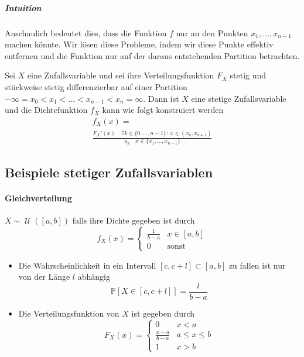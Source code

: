 \documentclass[a4paper,10pt]{article}
\def\P{\mathbb{P}}
\DeclareMathOperator{\Uniform}{\mathcal{U}}
\begin{document}
\subparagraph{Intuition} Anschaulich bedeutet dies, dass die Funktion \( f \) nur an den Punkten \( x_1, \dots, x_{n - 1} \)  machen könnte. Wir lösen diese Probleme, indem wir diese Punkte effektiv entfernen und die Funktion nur auf der daraus entstehenden Partition betrachten.

\begin{subbox}{}
    Sei \( X \) eine Zufallsvariable und sei ihre Verteilungsfunktion \( F_X \) stetig und stückweise stetig differenzierbar auf einer Partition \( -\infty = x_0 < x_1 < \dots < x_{n - 1} < x_n = \infty \). Dann ist \( X \) eine stetige Zufallsvariable und die Dichtefunktion \( f_X \) kann wie folgt konstruiert werden
    \begin{multline*}
        f_X(x) = \\
        \frac{F_X'(x) \quad \exists k \in \{0, \dots, n - 1\}: \: x \in (x_k, x_{k + 1})}{a_k \quad x \in \{x_1, \dots, x_{n - 1}\}}
    \end{multline*}
\end{subbox}


\subsection{Beispiele stetiger Zufallsvariablen}

\paragraph{Gleichverteilung} \( X \sim \Uniform([a, b]) \) falls ihre Dichte gegeben ist durch
\[ f_X(x) = \begin{cases}
    \frac{1}{b - a} & x \in [a, b] \\
    0 & \text{sonst}
\end{cases} \]

\begin{itemize}
    \item Die Wahrscheinlichkeit in ein Intervall \( [c, c + l] \subset [a, b] \) zu fallen ist nur von der Länge \( l \) abhängig \[ \P[X \in [c, c + l]] = \frac{l}{b - a} \]
    \item Die Verteilungsfunktion von \( X \) ist gegeben durch
    \[ F_X(x) = \begin{cases}
        0 & x < a \\
        \frac{x - a}{b - a} & a \leq x \leq b \\
        1 & x > b
    \end{cases} \]
\end{itemize}
\end{document}
